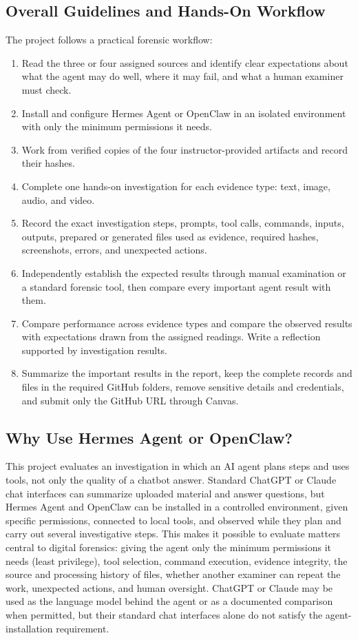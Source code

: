 \documentclass[12pt,letterpaper]{article}
\begin{document}
\subsection{Overall Guidelines and Hands-On Workflow}
The project follows a practical forensic workflow:
\begin{enumerate}
    \item Read the three or four assigned sources and identify clear expectations about what the agent may do well, where it may fail, and what a human examiner must check.
    \item Install and configure Hermes Agent or OpenClaw in an isolated environment with only the minimum permissions it needs.
    \item Work from verified copies of the four instructor-provided artifacts and record their hashes.
    \item Complete one hands-on investigation for each evidence type: text, image, audio, and video.
    \item Record the exact investigation steps, prompts, tool calls, commands, inputs, outputs, prepared or generated files used as evidence, required hashes, screenshots, errors, and unexpected actions.
    \item Independently establish the expected results through manual examination or a standard forensic tool, then compare every important agent result with them.
    \item Compare performance across evidence types and compare the observed results with expectations drawn from the assigned readings. Write a reflection supported by investigation results.
    \item Summarize the important results in the report, keep the complete records and files in the required GitHub folders, remove sensitive details and credentials, and submit only the GitHub URL through Canvas.
\end{enumerate}


\subsection{Why Use Hermes Agent or OpenClaw?}
This project evaluates an investigation in which an AI agent plans steps and uses tools, not only the quality of a chatbot answer. Standard ChatGPT or Claude chat interfaces can summarize uploaded material and answer questions, but Hermes Agent and OpenClaw can be installed in a controlled environment, given specific permissions, connected to local tools, and observed while they plan and carry out several investigative steps. This makes it possible to evaluate matters central to digital forensics: giving the agent only the minimum permissions it needs (least privilege), tool selection, command execution, evidence integrity, the source and processing history of files, whether another examiner can repeat the work, unexpected actions, and human oversight. ChatGPT or Claude may be used as the language model behind the agent or as a documented comparison when permitted, but their standard chat interfaces alone do not satisfy the agent-installation requirement.
\end{document}
